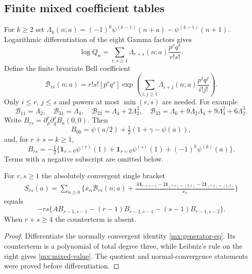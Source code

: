 \subsection{Finite mixed coefficient tables}
For $k\ge2$ set
$\Lambda_k(n;a)=(-1)^k\psi^{(k-1)}(n+a)-\psi^{(k-1)}(n+1)$.
Logarithmic differentiation of the eight Gamma factors gives
\begin{equation}\label{mx:logQ}
 \log Q_n=\sum_{r,s\ge1}\Lambda_{r+s}(n;a)\frac{p^rq^s}{r!s!}.
\end{equation}
Define the finite bivariate Bell coefficient
\[
 \mathcal B_{rs}(n;a)=r!s![p^rq^s]
 \exp\left(\sum_{i,j\ge1}\Lambda_{i+j}(n;a)\frac{p^iq^j}{i!j!}\right).
\]
Only $i\le r$, $j\le s$ and powers at most $\min(r,s)$ are needed.
For example
\[
 \mathcal B_{11}=\Lambda_2,\quad
 \mathcal B_{31}=\Lambda_4,\quad
 \mathcal B_{22}=\Lambda_4+2\Lambda_2^2,\quad
 \mathcal B_{33}=\Lambda_6+9\Lambda_2\Lambda_4+9\Lambda_3^2+6\Lambda_2^3.
\]
Write $B_{rs}=\partial_p^r\partial_q^sB_a(0,0)$. Then
\[
 B_{00}=\psi(a/2)+\tfrac12(1+\gamma-\psi(a)),
\]
and, for $r+s=k\ge1$,
\begin{equation}\label{mx:B-jets}
 B_{rs}=-\tfrac12\{
 \mathbf1_{s=0}\psi^{(r)}(1)+\mathbf1_{r=0}\psi^{(s)}(1)
                  +(-1)^k\psi^{(k)}(a)\}.
\end{equation}
Terms with a negative subscript are omitted below.
\begin{corollary}\label{mx:mixed-table}
For $r,s\ge1$ the absolutely convergent single bracket
\begin{align}
 S_{rs}(a)=\sum_{n\ge0}\bigg\{x_n\mathcal B_{rs}(n;a)
 +\frac{A\mathbf1_{r=s=1}-2\mathbf1_{(r,s)=(2,1)}
                         -2\mathbf1_{(r,s)=(1,2)}}{x_n}\bigg\}
 \label{mx:mixed-sum}
\end{align}
equals
\begin{equation}\label{mx:mixed-value}
 -rs\{A B_{r-1,s-1}-(r-1)B_{r-2,s-1}-(s-1)B_{r-1,s-2}\}.
\end{equation}
When $r+s\ge4$ the counterterm is absent.
\end{corollary}
\begin{proof}
Differentiate the normally convergent identity
\eqref{mx:generator-eq}. Its counterterm is a polynomial of total
degree three, while Leibniz's rule on the right gives
\eqref{mx:mixed-value}. The quotient and normal-convergence
statements were proved before differentiation.
\end{proof}

